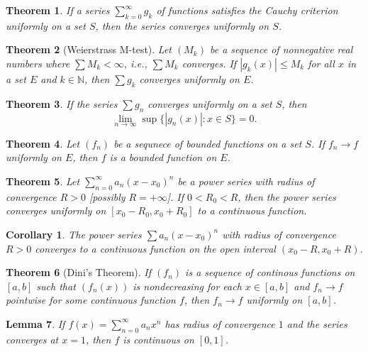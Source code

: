 \documentclass[12pt, lettersize]{book}
\theoremstyle{plain}
\newtheorem{thm}{Theorem}[section]
\newtheorem{lem}[thm]{Lemma}
\newtheorem{cor}{Corollary}[thm]
\theoremstyle{definition}
\theoremstyle{remark}
\newcommand{\N}{\mathbb{N}}
\begin{document}
		\begin{thm}\label{thm:25.6}
			If a series $\sum_{k=0}^{\infty}g_k$ of functions satisfies the Cauchy criterion uniformly on a set $S$, then the
			series converges uniformly on $S$.
		\end{thm}
		
		\begin{thm}[Weierstrass M-test]\label{thm:25.7}
			Let $(M_k)$ be a sequence of nonnegative real numbers where $\sum M_k<\infty$, i.e., $\sum M_k$ converges. If $|g_k(x)|\leq M_k$ for all $x$ in a set $E$ and $k\in\N$, then $\sum g_k$ converges uniformly on $E$.
		\end{thm}
		
		\begin{thm}
			If the series $\sum g_n$ converges uniformly on a set $S$, then
			\begin{displaymath}
				\lim\limits_{n\rightarrow\infty}\sup\{|g_n(x)|: x\in S\}=0.
			\end{displaymath}
		\end{thm}
		
		\begin{thm}
			Let $(f_n)$ be a sequnece of bounded functions on a set $S$. If $f_n\rightarrow f$ uniformly on $E$, then $f$ is a bounded function on $E$.
		\end{thm}
		
		\begin{thm}\label{thm:26.1}
			Let $\sum_{n=0}^{\infty}a_n(x-x_0)^n$ be a power series with radius of convergence $R>0$ [possibly $R=+\infty$]. If $0<R_0<R$, then the power series converges uniformly on $[x_0-R_0, x_0+R_0]$ to a continuous function.
		\end{thm}

		\begin{cor}\label{cor:26.2}
			The power series $\sum a_n(x-x_0)^n$ with radius of convergence $R>0$ converges to a continuous function on the open interval $(x_0-R,x_0+R)$.
		\end{cor}
		
		\begin{thm}[Dini's Theorem]
			If $(f_n)$ is a sequence of continous functions on $[a,b]$ such that $(f_n(x))$ is nondecreasing for each $x\in[a,b]$ and $f_n\rightarrow f$ pointwise for some continuous function $f$, then $f_n\rightarrow f$ uniformly on $[a,b]$.
		\end{thm}
		
		\begin{lem}
			If $f(x)=\sum_{n=0}^{\infty}a_nx^n$ has radius of convergence $1$ and the series converges at $x=1$, then $f$ is continuous on $[0,1]$.
		\end{lem}
		
\end{document}
